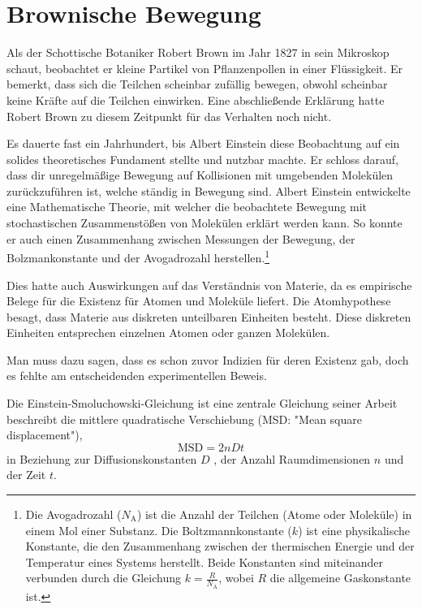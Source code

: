 %
%
%
%
\section{Brownische Bewegung\label{brown:BrownBewegung}}

Als der Schottische Botaniker Robert Brown im Jahr 1827 in sein Mikroskop schaut, beobachtet er kleine Partikel von Pflanzenpollen in einer Flüssigkeit. Er bemerkt, dass sich die Teilchen scheinbar zufällig bewegen, obwohl scheinbar keine Kräfte auf die Teilchen einwirken. Eine abschließende Erklärung hatte Robert Brown zu diesem Zeitpunkt für das Verhalten noch nicht.


Es dauerte fast ein Jahrhundert, bis Albert Einstein diese Beobachtung auf ein solides theoretisches Fundament stellte und nutzbar machte. Er schloss darauf, dass dir unregelmäßige Bewegung auf Kollisionen mit umgebenden Molekülen zurückzuführen ist, welche ständig in Bewegung sind. Albert Einstein entwickelte eine Mathematische Theorie, mit welcher die beobachtete Bewegung mit stochastischen Zusammenstößen von Molekülen erklärt werden kann. So konnte er auch einen Zusammenhang zwischen Messungen der Bewegung, der Bolzmankonstante und der  Avogadrozahl herstellen.\footnote{Die Avogadrozahl ($N_\mathrm{A}$) ist die Anzahl der Teilchen (Atome oder Moleküle) in einem Mol einer Substanz. Die Boltzmannkonstante ($k$) ist eine physikalische Konstante, die den Zusammenhang zwischen der thermischen Energie und der Temperatur eines Systems herstellt. Beide Konstanten sind miteinander verbunden durch die Gleichung $k = \frac{R}{N_\mathrm{A}}$, wobei $R$ die allgemeine Gaskonstante ist.}

Dies hatte auch Auswirkungen auf das Verständnis von Materie, da es empirische Belege für die Existenz für Atomen und Moleküle liefert. Die Atomhypothese besagt, dass Materie aus diskreten unteilbaren Einheiten besteht. Diese diskreten Einheiten entsprechen einzelnen Atomen oder ganzen Molekülen. 

Man muss dazu sagen, dass es schon zuvor Indizien für deren Existenz gab, doch es fehlte am entscheidenden experimentellen Beweis.

Die Einstein-Smoluchowski-Gleichung ist eine zentrale Gleichung seiner Arbeit beschreibt die mittlere quadratische Verschiebung (MSD: "Mean square displacement"),
\begin{equation}
	\mathrm{MSD} = 2nDt
\end{equation}
in Beziehung zur Diffusionskonstanten $ D $ , der Anzahl Raumdimensionen $ n $ und der Zeit $ t $.

